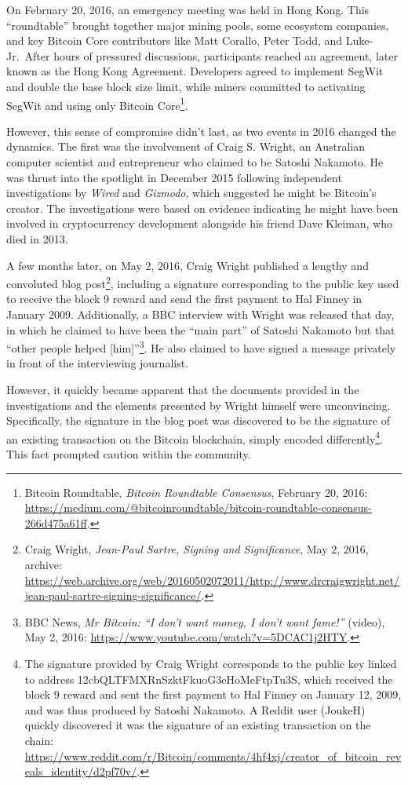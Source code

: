 \documentclass[
  a5paper,
  smalldemyvopaper,10pt,twoside,onecolumn,openright,extrafontsizes,hidelinks]{memoir}
\begin{document}
On February 20, 2016, an emergency meeting was held in Hong Kong. This
``roundtable'' brought together major mining pools, some ecosystem
companies, and key Bitcoin Core contributors like Matt Corallo, Peter
Todd, and Luke-Jr.~After hours of pressured discussions, participants
reached an agreement, later known as the Hong Kong Agreement. Developers
agreed to implement SegWit and double the base block size limit, while
miners committed to activating SegWit and using only Bitcoin
Core\footnote{Bitcoin Roundtable, \emph{Bitcoin Roundtable Consensus},
  February 20, 2016:
  \url{https://medium.com/@bitcoinroundtable/bitcoin-roundtable-consensus-266d475a61ff}.}.

However, this sense of compromise didn't last, as two events in 2016
changed the dynamics. The first was the involvement of Craig S. Wright,
an Australian computer scientist and entrepreneur who claimed to be
Satoshi Nakamoto. He was thrust into the spotlight in December 2015
following independent investigations by \emph{Wired} and \emph{Gizmodo},
which suggested he might be Bitcoin's creator. The investigations were
based on evidence indicating he might have been involved in
cryptocurrency development alongside his friend Dave Kleiman, who died
in 2013.

A few months later, on May 2, 2016, Craig Wright published a lengthy and
convoluted blog post\footnote{Craig Wright, \emph{Jean-Paul Sartre,
  Signing and Significance}, May 2, 2016, archive:
  \url{https://web.archive.org/web/20160502072011/http://www.drcraigwright.net/jean-paul-sartre-signing-significance/}.},
including a signature corresponding to the public key used to receive
the block 9 reward and send the first payment to Hal Finney in January
2009. Additionally, a BBC interview with Wright was released that day,
in which he claimed to have been the ``main part'' of Satoshi Nakamoto
but that ``other people helped {[}him{]}''\footnote{BBC News, \emph{Mr
  Bitcoin: ``I don't want money, I don't want fame!''} (video), May 2,
  2016: \url{https://www.youtube.com/watch?v=5DCAC1j2HTY}.}. He also
claimed to have signed a message privately in front of the interviewing
journalist.

However, it quickly became apparent that the documents provided in the
investigations and the elements presented by Wright himself were
unconvincing. Specifically, the signature in the blog post was
discovered to be the signature of an existing transaction on the Bitcoin
blockchain, simply encoded differently\footnote{The signature provided
  by Craig Wright corresponds to the public key linked to address
  12cbQLTFMXRnSzktFkuoG3eHoMeFtpTu3S, which received the block 9 reward
  and sent the first payment to Hal Finney on January 12, 2009, and was
  thus produced by Satoshi Nakamoto. A Reddit user (JoukeH) quickly
  discovered it was the signature of an existing transaction on the
  chain:
  \url{https://www.reddit.com/r/Bitcoin/comments/4hf4xj/creator_of_bitcoin_reveals_identity/d2pf70v/}.}.
This fact prompted caution within the community.
\end{document}
